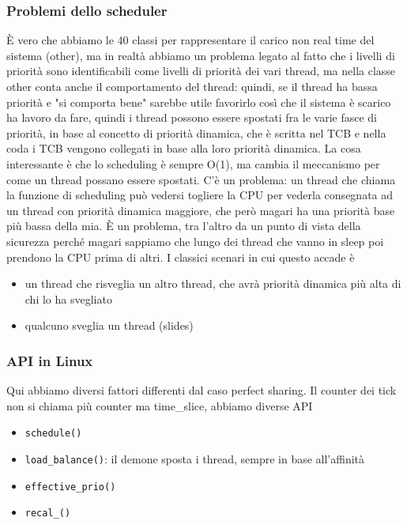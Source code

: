 \documentclass[12pt, oneside]{extbook}
\begin{document}
\subsubsection{Problemi dello scheduler}
È vero che abbiamo le 40 classi per rappresentare il carico non real time del sistema (other), ma in realtà abbiamo un problema legato al fatto che i livelli di priorità sono identificabili come livelli di priorità dei vari thread, ma nella classe other conta anche il comportamento del thread: quindi, se il thread ha bassa priorità e "si comporta bene" sarebbe utile favorirlo così che il sistema è scarico ha lavoro da fare, quindi i thread possono essere spostati fra le varie fasce di priorità, in base al concetto di priorità dinamica, che è scritta nel TCB e nella coda i TCB vengono collegati in base alla loro priorità dinamica. La cosa interessante è che lo scheduling è sempre O(1), ma cambia il meccanismo per come un thread possano essere spostati. C'è un problema: un thread che chiama la funzione di scheduling può vedersi togliere la CPU per vederla consegnata ad un thread con priorità dinamica maggiore, che però magari ha una priorità base più bassa della mia. È un problema, tra l'altro da un punto di vista della sicurezza perché magari sappiamo che lungo dei thread che vanno in sleep poi prendono la CPU prima di altri. I classici scenari in cui questo accade è
\begin{itemize}
\item un thread che risveglia un altro thread, che avrà priorità dinamica più alta di chi lo ha svegliato
\item qualcuno sveglia un thread (slides)
\end{itemize}
\subsubsection{API in Linux}
Qui abbiamo diversi fattori differenti dal caso perfect sharing. Il counter dei tick non si chiama più counter ma time\_slice, abbiamo diverse API
\begin{itemize}
\item \texttt{schedule()}
\item \texttt{load\_balance()}: il demone sposta i thread, sempre in base all'affinità
\item \texttt{effective\_prio()}
\item \texttt{recal\_()}
\end{itemize}
\end{document}
